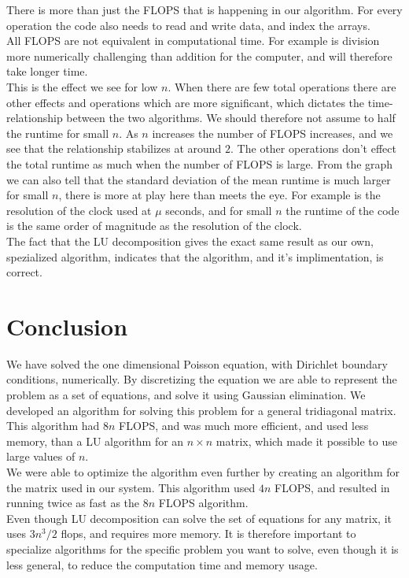 \documentclass[%
 reprint,
nofootinbib,
 amsmath,amssymb,
 aps,
]{revtex4-1}
\begin{document}
There is more than just the FLOPS that is happening in our algorithm. For every operation the code also needs to read and write data, and index the arrays. \\
All FLOPS are not equivalent in computational time. For example is division more numerically challenging than addition for the computer, and will therefore take longer time. \\
This is the effect we see for low $n$. When there are few total operations there are other effects and operations which are more significant, which dictates the time-relationship between the two algorithms. We should therefore not assume to half the runtime for small $n$. As $n$ increases the number of FLOPS increases, and we see that the relationship stabilizes at around $2$. The other operations don't effect the total runtime as much when the number of FLOPS is large. From the graph we can also tell that the standard deviation of the mean runtime is much larger for small $n$, there is more at play here than meets the eye. For example is the resolution of the clock used at $\mu$ seconds, and for small $n$ the runtime of the code is the same order of magnitude as the resolution of the clock.\\
The fact that the LU decomposition gives the exact same result as our own, spezialized algorithm, indicates that the algorithm, and it's implimentation, is correct.

\section{Conclusion}

We have solved the one dimensional Poisson equation, with Dirichlet boundary conditions, numerically. By discretizing the equation we are able to represent the problem as a set of equations, and solve it using Gaussian elimination. We developed an algorithm for solving this problem for a general tridiagonal matrix. This algorithm had $8n$ FLOPS, and was much more efficient, and used less memory, than a LU algorithm for an $n\times n$ matrix, which made it possible to use large values of $n$.\\
We were able to optimize the algorithm even further by creating an algorithm for the matrix used in our system. This algorithm used $4n$ FLOPS, and resulted in running twice as fast as the $8n$ FLOPS algorithm. \\
Even though LU decomposition can solve the set of equations for any matrix, it uses $3n^3/2$ flops, and requires more memory. It is therefore important to specialize algorithms for the specific problem you want to solve, even though it is less general, to reduce the computation time and memory usage.
\end{document}

